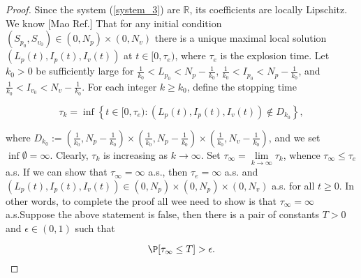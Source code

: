 \begin{proof}
	Since the system (\ref{system_3}) are $\mathbb{R}$, its coefficients are locally Lipschitz. We know [Mao Ref.] That for any initial condition $ (S_{p_0}, S_{v_0}) \in (0, N_p) \times (0, N_v) $ there is a unique maximal local solution $ (L_p (t), I_p (t) , I_v (t)) $ at $ t \in [0, \tau_e) $, where $ \tau_e $ is the explosion time. Let $k_0>0$ be sufficiently large for $\frac{1}{k_0}<L_{p_0}<N_p-\frac{1}{k_0}$, $\frac{1}{k_0}<I_{p_0}<N_p-\frac{1}{k_0}$, and $\frac{1}{k_0}<I_{v_0}<N_v-\frac{1}{k_0}$. For each integer $k\geq k_0$, define the stopping time
	
	\begin{equation*}
		\tau_k =\inf\left\{t\in [0,\tau_e): (L_p(t),I_p(t),I_v(t))\notin D_{k_0}\right\},
	\end{equation*}
	
	where $D_{k_0} :=\left(\frac{1}{k_0},N_p-\frac{1}{k_0}\right)\times\left(\frac{1}{k_0},N_p-\frac{1}{k_0}\right)\times\left(\frac{1}{k_0},N_v-\frac{1}{k_0}\right)$, and we set $\inf \emptyset=\infty$. Clearly, $\tau_k$ is increasing as $k\rightarrow \infty$. Set $\tau_\infty = \lim\limits_{k\rightarrow \infty}\tau_k$, whence $\tau_\infty\leq \tau_e$ a.s. If we can show that $\tau_\infty = \infty$ a.s., then $\tau_e = \infty$ a.s. and $(L_p(t),I_p(t),I_v(t))\in (0,N_p)\times(0,N_p)\times(0,N_v)$ a.s. for all $t\geq 0$. In other words, to complete the proof all wee need to show is that $\tau_\infty=\infty$ a.s.Suppose the above statement is false, then there is a pair of constants $T>0$ and $\epsilon  \in (0,1)$ such that
	
	\begin{equation*}
		\P[\tau_\infty\leq T]>\epsilon.
	\end{equation*}
	

\end{proof}

